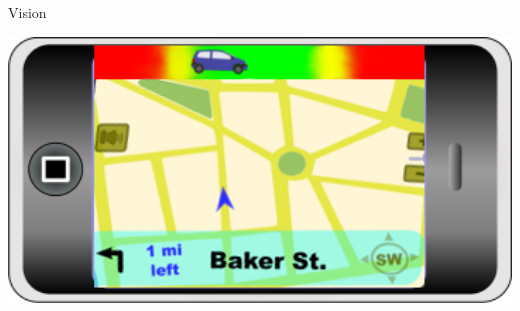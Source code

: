 \begin{frame}{Vision}
\begin{center}
\includegraphics[width=1\textwidth]{../images/product.png}
\end{center}
\end{frame}
